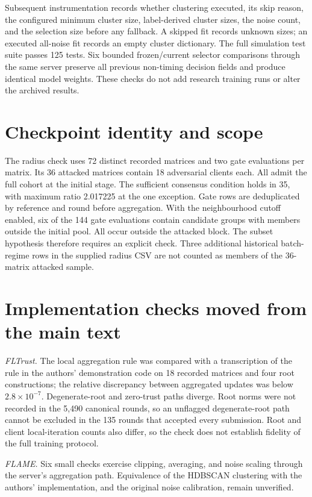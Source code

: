 \documentclass[journal]{IEEEtran}
\begin{document}
Subsequent instrumentation records whether clustering executed, its skip reason, the configured minimum cluster size, label-derived cluster sizes, the noise count, and the selection size before any fallback. A skipped fit records unknown sizes; an executed all-noise fit records an empty cluster dictionary. The full simulation test suite passes 125 tests. Six bounded frozen/current selector comparisons through the same server preserve all previous non-timing decision fields and produce identical model weights. These checks do not add research training runs or alter the archived results.

\section{Checkpoint identity and scope}
The radius check uses 72 distinct recorded matrices and two gate evaluations per matrix. Its 36 attacked matrices contain 18 adversarial clients each. All admit the full cohort at the initial stage. The sufficient consensus condition holds in 35, with maximum ratio 2.017225 at the one exception. Gate rows are deduplicated by reference and round before aggregation. With the neighbourhood cutoff enabled, six of the 144 gate evaluations contain candidate groups with members outside the initial pool. All occur outside the attacked block. The subset hypothesis therefore requires an explicit check. Three additional historical batch-regime rows in the supplied radius CSV are not counted as members of the 36-matrix attacked sample.

\section{Implementation checks moved from the main text}
\emph{FLTrust.} The local aggregation rule was compared with a transcription of the rule in the authors' demonstration code on 18 recorded matrices and four root constructions; the relative discrepancy between aggregated updates was below $2.8\times10^{-7}$. Degenerate-root and zero-trust paths diverge. Root norms were not recorded in the 5{,}490 canonical rounds, so an unflagged degenerate-root path cannot be excluded in the 135 rounds that accepted every submission. Root and client local-iteration counts also differ, so the check does not establish fidelity of the full training protocol.

\emph{FLAME.} Six small checks exercise clipping, averaging, and noise scaling through the server's aggregation path. Equivalence of the HDBSCAN clustering with the authors' implementation, and the original noise calibration, remain unverified.
\end{document}
